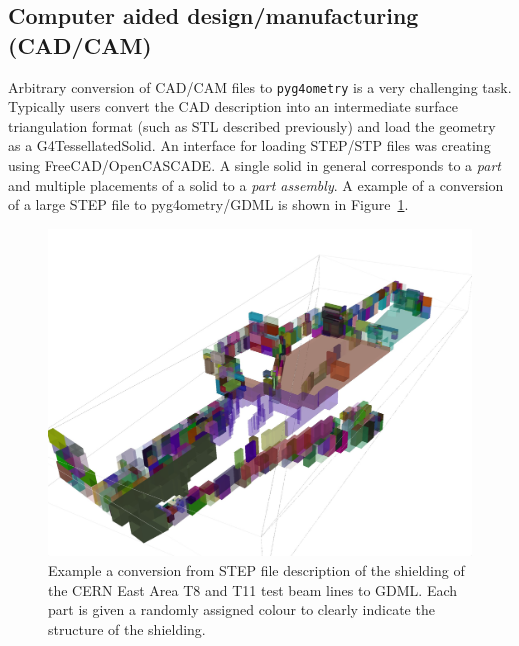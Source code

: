 \documentclass[a4paper,
               keeplastbox,   %
               ]{jacow}
\begin{document}
\subsection{Computer aided design/manufacturing (CAD/CAM)}
Arbitrary conversion of CAD/CAM files to \verb|pyg4ometry| is a very challenging task. Typically users convert the CAD description into
an intermediate surface triangulation format (such as STL described previously) and load the geometry as a G4TessellatedSolid. An interface for
loading STEP/STP files was creating using FreeCAD/OpenCASCADE. A single solid in general corresponds to a {\it part} and multiple placements 
of a solid to a {\it part assembly}.
A example of a conversion of a large STEP file to pyg4ometry/GDML is shown in Figure~\ref{fig:ea910}.
\begin{figure}[!htb]
   \centering
   \includegraphics*[width=1.0\columnwidth]{./examples/ea9-10.jpg}
   \caption{Example a conversion from STEP file description of the shielding of the CERN East Area T8 and T11 test beam lines to GDML. Each part is 
   given a randomly assigned colour to clearly indicate the structure of the shielding.}
   \label{fig:ea910}
\end{figure}
\end{document}
